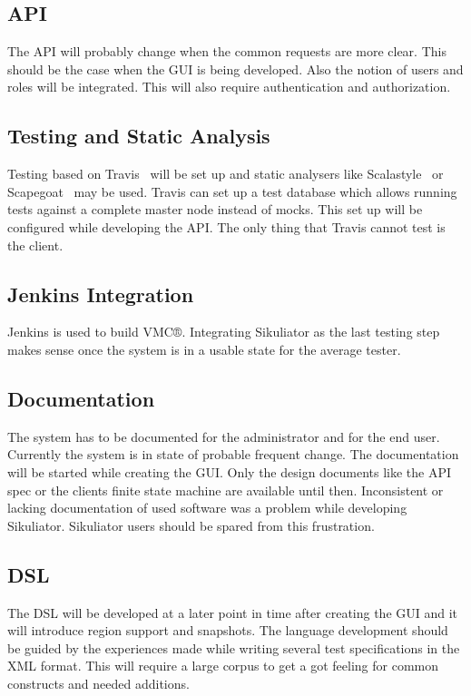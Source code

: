 \documentclass[a4paper,twocolumn,twoside]{article}
\newcommand{\VMC}[0]{VMC®}
\newcommand{\Sik}[0]{Sikuliator}
\begin{document}
\subsection{API}
The API will probably change when the common requests are more clear.
This should be the case when the GUI is being developed.
Also the notion of users and roles will be integrated.
This will also require authentication and authorization.

\subsection{Testing and Static Analysis}
Testing based on Travis~\cite{Travis} will be set up and static analysers like Scalastyle~\cite{Scalastyle} or Scapegoat~\cite{Scapegoat} may be used.
Travis can set up a test database which allows running tests against a complete master node instead of mocks.
This set up will be configured while developing the API.
The only thing that Travis cannot test is the client.

\subsection{Jenkins Integration}
Jenkins is used to build \VMC{}.
Integrating \Sik{} as the last testing step makes sense once the system is in a usable state for the average tester.

\subsection{Documentation}
The system has to be documented for the administrator and for the end user.
Currently the system is in state of probable frequent change.
The documentation will be started while creating the GUI. 
Only the design documents like the API spec or the clients finite state machine are available until then.
Inconsistent or lacking documentation of used software was a problem while developing \Sik{}.
\Sik{} users should be spared from this frustration.

\subsection{DSL}
The DSL will be developed at a later point in time after creating the GUI and it will introduce region support and snapshots.
The language development should be guided by the experiences made while writing several test specifications in the XML format.
This will require a large corpus to get a got feeling for common constructs and needed additions.





\printbibliography[notkeyword=software,resetnumbers=true,prefixnumbers=R]
\printbibliography[keyword=used,title={Used software},resetnumbers=true,prefixnumbers=US]
\printbibliography[notkeyword=used,keyword=software,title={Other software},resetnumbers=true,prefixnumbers=OS]
\end{document}
